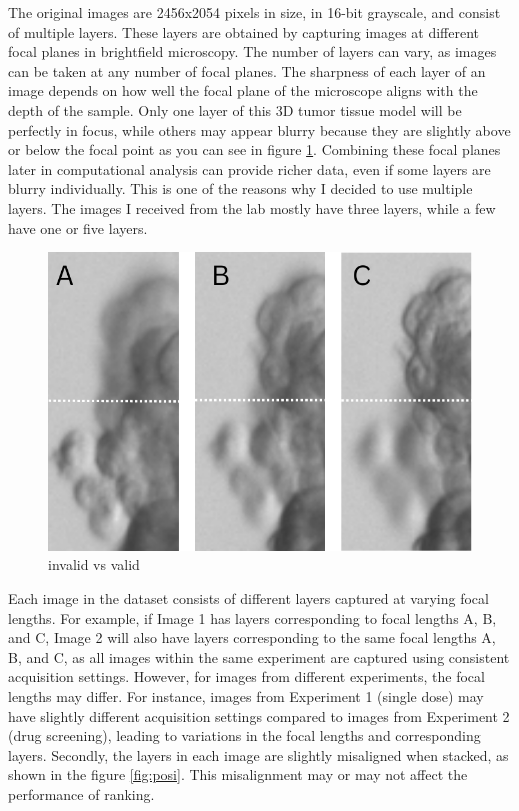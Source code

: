   The original images are 2456x2054 pixels in size, in 16-bit grayscale, and consist of multiple layers. These layers are obtained by capturing images
   at different focal planes in brightfield microscopy. The number of layers can vary, as images can be taken at any number of focal planes. The sharpness 
   of each layer of an image depends on how well the focal plane of the microscope aligns with the depth of the sample. Only one layer of this 3D tumor tissue model will 
   be perfectly in focus, while others may appear blurry because they are slightly above or below the focal point as you can see in figure \ref{fig:blur}. Combining these focal planes later in 
   computational analysis can provide richer data, even if some layers are blurry individually. This is one of the reasons why I decided to use multiple
    layers. The images I received from the lab mostly have three layers, while a few have one or five layers.

    \begin{figure}[H]
      \centering
      \includegraphics[scale=0.4]{figures/blur.png} 
      \caption{invalid vs valid}
      \label{fig:blur}
    \end{figure}

Each image in the dataset consists of different layers captured at varying focal lengths. For example, if Image 1 has layers corresponding to focal
 lengths A, B, and C, Image 2 will also have layers corresponding to the same focal lengths A, B, and C, as all images within the same experiment are 
 captured using consistent acquisition settings. However, for images from different experiments, the focal lengths may differ. For instance, images from 
 Experiment 1 (single dose) may have slightly different acquisition settings compared to images from Experiment 2 (drug screening), leading to variations 
 in the focal lengths and corresponding layers. 
 Secondly, the layers in each image are slightly misaligned when stacked, as shown in the figure  \ref{fig:posi}. This misalignment may or may not affect the performance of ranking.

